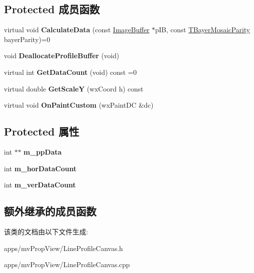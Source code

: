 \subsection*{Protected 成员函数}
\begin{DoxyCompactItemize}
\item 
\hypertarget{class_line_profile_canvas_ae247b81501a381b9a7617bfe923db30a}{virtual void {\bfseries Calculate\+Data} (const \hyperlink{struct_image_buffer}{Image\+Buffer} $\ast$p\+I\+B, const \hyperlink{group___common_interface_ga9e2a1b46f3ed21b46b867c6d88d25598}{T\+Bayer\+Mosaic\+Parity} bayer\+Parity)=0}\label{class_line_profile_canvas_ae247b81501a381b9a7617bfe923db30a}

\item 
\hypertarget{class_line_profile_canvas_a85d80306f42caf5126122d2b0b963ad8}{void {\bfseries Deallocate\+Profile\+Buffer} (void)}\label{class_line_profile_canvas_a85d80306f42caf5126122d2b0b963ad8}

\item 
\hypertarget{class_line_profile_canvas_ae8d7280f444e30dc175b6f30962a29d8}{virtual int {\bfseries Get\+Data\+Count} (void) const =0}\label{class_line_profile_canvas_ae8d7280f444e30dc175b6f30962a29d8}

\item 
\hypertarget{class_line_profile_canvas_a334e213f608e6d32288c916e0a2d2927}{virtual double {\bfseries Get\+Scale\+Y} (wx\+Coord h) const }\label{class_line_profile_canvas_a334e213f608e6d32288c916e0a2d2927}

\item 
\hypertarget{class_line_profile_canvas_addf36475adb367f5787cd4b0c40f4ac5}{virtual void {\bfseries On\+Paint\+Custom} (wx\+Paint\+D\+C \&dc)}\label{class_line_profile_canvas_addf36475adb367f5787cd4b0c40f4ac5}

\end{DoxyCompactItemize}
\subsection*{Protected 属性}
\begin{DoxyCompactItemize}
\item 
\hypertarget{class_line_profile_canvas_ad6e2adc66f683ca6ac18855d90b8ca91}{int $\ast$$\ast$ {\bfseries m\+\_\+pp\+Data}}\label{class_line_profile_canvas_ad6e2adc66f683ca6ac18855d90b8ca91}

\item 
\hypertarget{class_line_profile_canvas_af462171e7b87565ed03c4785b3e4fba7}{int {\bfseries m\+\_\+hor\+Data\+Count}}\label{class_line_profile_canvas_af462171e7b87565ed03c4785b3e4fba7}

\item 
\hypertarget{class_line_profile_canvas_ac7dc76447b5e041f5bc27cc16ba9376d}{int {\bfseries m\+\_\+ver\+Data\+Count}}\label{class_line_profile_canvas_ac7dc76447b5e041f5bc27cc16ba9376d}

\end{DoxyCompactItemize}
\subsection*{额外继承的成员函数}


该类的文档由以下文件生成\+:\begin{DoxyCompactItemize}
\item 
apps/mv\+Prop\+View/Line\+Profile\+Canvas.\+h\item 
apps/mv\+Prop\+View/Line\+Profile\+Canvas.\+cpp\end{DoxyCompactItemize}
